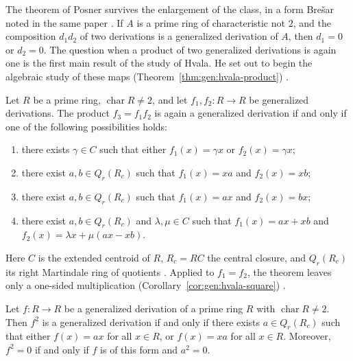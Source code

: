 The theorem of Posner survives the enlargement of the class, in a form Brešar
noted in the same paper \cite[Remark~3, pp.~90--91]{Bresar1991Glasgow}.
If $A$ is a prime ring of characteristic not $2$, and the composition $d_{1}d_{2}$
of two derivations is a generalized derivation of $A$, then $d_{1}=0$ or
$d_{2}=0$.
The question when a product of two generalized derivations
is again one is the first main result of the study of Hvala.
He set out to begin the algebraic study of these maps (Theorem~\ref{thm:gen:hvala-product})
\cite[p.~1147]{Hvala1998}.\begin{theorem}\label{thm:gen:hvala-product}
Let $R$ be a prime ring, $\operatorname{char}R\neq 2$, and let
$f_{1},f_{2}\colon R\to R$ be generalized derivations. The product
$f_{3}=f_{1}f_{2}$ is again a generalized derivation if and only if one of
the following possibilities holds:
\begin{enumerate}
\item[(i)] there exists $\gamma\in C$ such that either $f_{1}(x)=\gamma x$ or
$f_{2}(x)=\gamma x$;
\item[(ii)] there exist $a,b\in Q_{r}(R_{c})$ such that $f_{1}(x)=xa$ and
$f_{2}(x)=xb$;
\item[(iii)] there exist $a,b\in Q_{r}(R_{c})$ such that $f_{1}(x)=ax$ and
$f_{2}(x)=bx$;
\item[(iv)] there exist $a,b\in Q_{r}(R_{c})$ and $\lambda,\mu\in C$ such
that $f_{1}(x)=ax+xb$ and $f_{2}(x)=\lambda x+\mu(ax-xb)$.
\end{enumerate}
\end{theorem}

Here $C$ is the extended centroid of $R$, $R_{c}=RC$ the central closure,
and $Q_{r}(R_{c})$ its right Martindale ring of quotients
\cite[p.~1148]{Hvala1998}. Applied to $f_{1}=f_{2}$, the theorem leaves only
a one-sided multiplication (Corollary~\ref{cor:gen:hvala-square}) \cite[Corollary~5, p.~1151]{Hvala1998}.

\begin{corollary}\label{cor:gen:hvala-square}
Let $f\colon R\to R$ be a generalized derivation of a prime ring $R$ with
$\operatorname{char}R\neq 2$. Then $f^{2}$ is a generalized derivation if and
only if there exists $a\in Q_{r}(R_{c})$ such that either $f(x)=ax$ for all
$x\in R$, or $f(x)=xa$ for all $x\in R$. Moreover, $f^{2}=0$ if and only if
$f$ is of this form and $a^{2}=0$.
\end{corollary}


